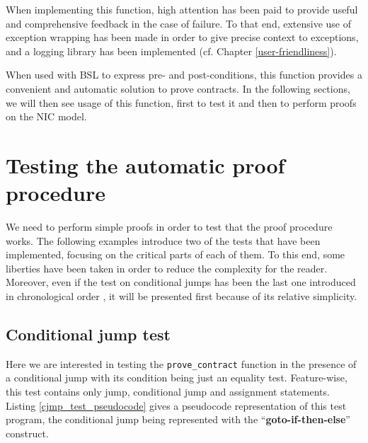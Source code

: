 \documentclass{kththesis}
\begin{document}
{

When implementing this function, high attention has been paid to provide useful and comprehensive feedback in the case of failure. To that end, extensive use of exception wrapping has been made in order to give precise context to exceptions, and a logging library has been implemented (cf. Chapter \ref{user-friendliness}).

When used with \gls{BSL} to express pre- and post-conditions, this function provides a convenient and automatic solution to prove contracts. In the following sections, we will then see usage of this function, first to test it and then to perform proofs on the NIC model.

\section{Testing the automatic proof procedure}

We need to perform simple proofs in order to test that the proof procedure works. The following examples introduce two of the tests that have been implemented, focusing on the critical parts of each of them. To this end, some liberties have been taken in order to reduce the complexity for the reader. Moreover, even if the test on conditional jumps has been the last one introduced in chronological order \footnotemark, it will be presented first because of its relative simplicity.


\subsection{Conditional jump test} \label{cjmp_test}

Here we are interested in testing the \texttt{prove\_contract} function in the presence of a conditional jump with its condition being just an equality test. Feature-wise, this test contains only jump, conditional jump and assignment statements. Listing \ref{cjmp_test_pseudocode} gives a pseudocode representation of this test program, the conditional jump being represented with the ``\textbf{goto-if-then-else}'' construct.

}
\end{document}
